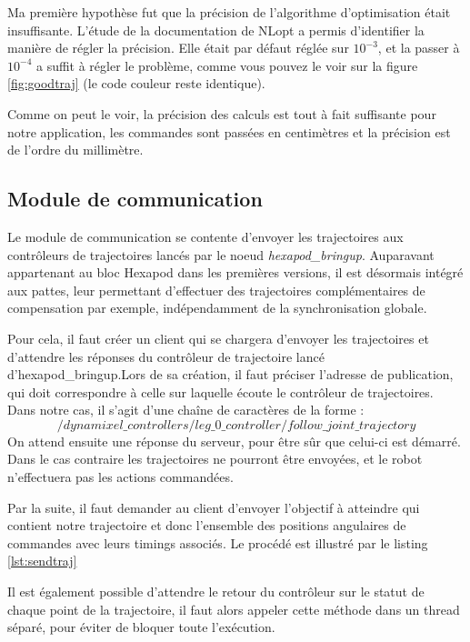 \documentclass{tnreport}
\begin{document}
Ma première hypothèse fut que la précision de l'algorithme d'optimisation était insuffisante. L'étude de la documentation de NLopt a permis d'identifier la manière de régler la précision. Elle était par défaut réglée sur $10^{-3}$, et la passer à $10^{-4}$ a suffit à régler le problème, comme vous pouvez le voir sur la figure \ref{fig:goodtraj} (le code couleur reste identique).

\label{lb:precisionkine} Comme on peut le voir, la précision des calculs est tout à fait suffisante pour notre application, les commandes sont passées en centimètres et la précision est de l'ordre du millimètre. 

\subsection{Module de communication}\label{lb:communication}
Le module de communication se contente d'envoyer les trajectoires aux contrôleurs de trajectoires lancés par le noeud \textit{hexapod\_bringup}. Auparavant appartenant au bloc Hexapod dans les premières versions, il est désormais intégré aux pattes, leur permettant d'effectuer des trajectoires complémentaires de compensation par exemple, indépendamment de la synchronisation globale.

Pour cela, il faut créer un client qui se chargera d'envoyer les trajectoires et d'attendre les réponses du contrôleur de trajectoire lancé d'hexapod\_bringup.Lors de sa création, il faut préciser l'adresse de publication, qui doit correspondre à celle sur laquelle écoute le contrôleur de trajectoires. Dans notre cas, il s'agit d'une chaîne de caractères de la forme :
\begin{equation}
/dynamixel\_controllers/leg\_0\_controller/follow\_joint\_trajectory
\end{equation}
On attend ensuite une réponse du serveur, pour être sûr que celui-ci est démarré. Dans le cas contraire les trajectoires ne pourront être envoyées, et le robot n'effectuera pas les actions commandées. 

Par la suite, il faut demander au client d'envoyer l'objectif à atteindre qui contient notre trajectoire et donc l'ensemble des positions angulaires de commandes avec leurs timings associés. Le procédé est illustré par le listing \ref{lst:sendtraj} 

Il est également possible d'attendre le retour du contrôleur sur le statut de chaque point de la trajectoire, il faut alors appeler cette méthode dans un thread séparé, pour éviter de bloquer toute l'exécution. 
\end{document}
